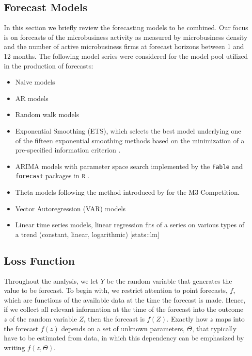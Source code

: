\documentclass[
a4paper, %
12pt, %
]{CascadeAnalyticsWPS}
\begin{document}
\subsection{Forecast Models}
\label{sec:sec3.1}
In this section we briefly review the forecasting models to be combined. Our focus is on forecasts of the microbusiness activity as measured by microbusiness density and the number of active microbusiness firms at forecast horizons between 1 and 12 months. The following model series were considered for the model pool utilized in the production of forecasts:
\begin{itemize}
\item Naive models 
\item AR models
\item Random walk models
\item Exponential Smoothing (ETS), which selects the best model
underlying one of the fifteen exponential smoothing
methods based on the minimization of a pre-specified
information criterion \citep{hyndman2002}.
\item ARIMA models with parameter space search implemented by the \texttt{\footnotesize{Fable}} and \texttt{\footnotesize{forecast}} packages in \texttt{\footnotesize{R}} \citep{hyndman2008}.
\item Theta models following the method introduced by \cite{assimakopoulos_2000} for the M3 Competition.
\item Vector Autoregression (VAR) models
\item Linear time series models, linear regression fits of a series
on various types of a trend (constant, linear,
logarithmic) [stats::lm]
\end{itemize}

\subsection{Loss Function}

Throughout the analysis, we let $Y$ be the random variable that generates the value to
be forecast. To begin with, we restrict attention to point forecasts, $f$, which are functions
of the available data at the time the forecast is made. Hence, if we collect all relevant
information at the time of the forecast into the outcome $z$ of the random variable $Z$, then the forecast is $f(Z)$. Exactly how $z$ maps into the forecast $f(z)$ depends on a set of unknown parameters, $\Theta$, that typically have to be estimated from data, in which this dependency can be emphasized by writing $f(z, \Theta)$.
\end{document}
